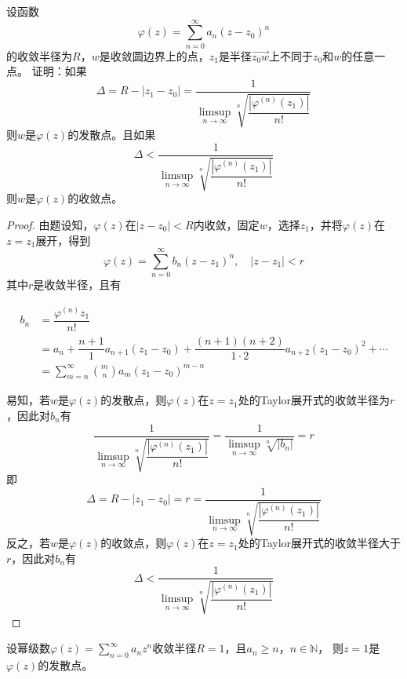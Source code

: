 \begin{lemma}\label{lemma:radius}

    设函数
    \[\varphi(z) = \sum\limits_{n = 0}^{\infty}{a_n (z - z_0)^n}\]
    的收敛半径为$R$，$w$是收敛圆边界上的点，$z_1$是半径$\vec{z_0w}$上不同于$z_0$和$w$的任意一点。
    证明：如果
    \[\Delta = R - |z_1 - z_0| = \dfrac{1}{\limsup\limits_{n \to \infty}{\sqrt[n]{\dfrac{|\varphi^{(n)}(z_1)|}{n!}}}}\]
    则$w$是$\varphi(z)$的发散点。且如果
    \[\Delta < \dfrac{1}{\limsup\limits_{n \to \infty}{\sqrt[n]{\dfrac{|\varphi^{(n)}(z_1)|}{n!}}}}\]
    则$w$是$\varphi(z)$的收敛点。

\end{lemma}

\begin{proof}

    由题设知，$\varphi(z)$在$|z - z_0| < R$内收敛，固定$w$，选择$z_1$，并将$\varphi(z)$在$z = z_1$展开，得到
    \[\varphi(z) = \sum\limits_{n = 0}^{\infty}{b_n (z - z_1)^n}, \quad |z - z_1| < r\]
    其中$r$是收敛半径，且有

    \begin{align*}
        b_n & = \dfrac{\varphi^{(n)}{z_1}}{n!} \\
        & = a_n + \dfrac{n + 1}{1}a_{n + 1}(z_1 - z_0) + \dfrac{(n + 1)(n + 2)}{1 \cdot 2}a_{n + 2}(z_1 - z_0)^2 + \cdots \\
        & = \sum\limits_{m = n}^{\infty}{\binom{m}{n}a_m(z_1 - z_0)^{m - n}}
    \end{align*}

    易知，若$w$是$\varphi(z)$的发散点，则$\varphi(z)$在$z = z_1$处的\textup{Taylor}展开式的收敛半径为$r$，因此对$b_n$有
    \[\dfrac{1}{\limsup\limits_{n \to \infty}{\sqrt[n]{\dfrac{|\varphi^{(n)}(z_1)|}{n!}}}} = \dfrac{1}{\limsup\limits_{n \to \infty}{\sqrt[n]{|b_n|}}} = r\]
    即
    \[\Delta = R - |z_1 - z_0| = r = \dfrac{1}{\limsup\limits_{n \to \infty}{\sqrt[n]{\dfrac{|\varphi^{(n)}(z_1)|}{n!}}}}\]
    反之，若$w$是$\varphi(z)$的收敛点，则$\varphi(z)$在$z = z_1$处的\textup{Taylor}展开式的收敛半径大于$r$，因此对$b_n$有
    \[\Delta < \dfrac{1}{\limsup\limits_{n \to \infty}{\sqrt[n]{\dfrac{|\varphi^{(n)}(z_1)|}{n!}}}}\]

\end{proof}

\begin{theorem}[Pringshajm定理]
    
    设幂级数$\varphi(z) = \sum\limits_{n = 0}^{\infty}{a_n z^n}$收敛半径$R = 1$，且$a_n \geq n$，$n \in \mathbb{N}$，
    则$z = 1$是$\varphi(z)$的发散点。

\end{theorem}

